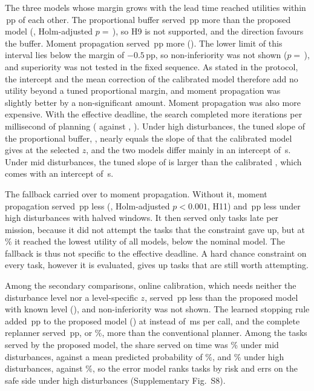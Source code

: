 The three models whose margin grows with the lead time reached utilities within \,pp of each other.
The proportional buffer served \,pp more than the proposed model (,
Holm-adjusted $p=$\,), so H9 is not supported, and the direction favours the buffer. Moment
propagation served \,pp more (). The lower limit of this interval lies below the margin of
$-0.5$\,pp, so non-inferiority was not shown ($p=$\,), and superiority was not tested in the fixed
sequence. As stated in the protocol, the intercept and the mean correction of the calibrated model therefore add no
utility beyond a tuned proportional margin, and moment propagation was slightly better by a non-significant amount.
Moment propagation was also more expensive. With the effective deadline, the search completed  more
iterations per millisecond of planning ( against , ). Under high disturbances,
the tuned slope of the proportional buffer, , nearly equals the slope of  that the
calibrated model gives at the selected $z$, and the two models differ mainly in an intercept of \,s.
Under mid disturbances, the tuned slope of  is larger than the calibrated , which comes
with an intercept of \,s.

The fallback carried over to moment propagation. Without it, moment propagation served \,pp less
(, Holm-adjusted $p<0.001$, H11) and \,pp less under high disturbances with
halved windows. It then served only  tasks late per mission, because it did not attempt the tasks that
the constraint gave up, but at \% it reached the lowest utility of all models, below the nominal model.
The fallback is thus not specific to the effective deadline. A hard chance constraint on every task, however it is
evaluated, gives up tasks that are still worth attempting.

Among the secondary comparisons, online calibration, which needs neither the disturbance level nor a level-specific
$z$, served \,pp less than the proposed model with known level (), and non-inferiority was
not shown. The learned stopping rule added \,pp to the proposed model () at
 instead of \,ms per call, and the complete replanner served \,pp, or
\%, more than the conventional planner. Among the tasks served by the proposed model, the share
served on time was \% under mid disturbances, against a mean predicted probability of
\%, and \% under high disturbances, against \%, so the error
model ranks tasks by risk and errs on the safe side under high disturbances (Supplementary Fig.~S8).

